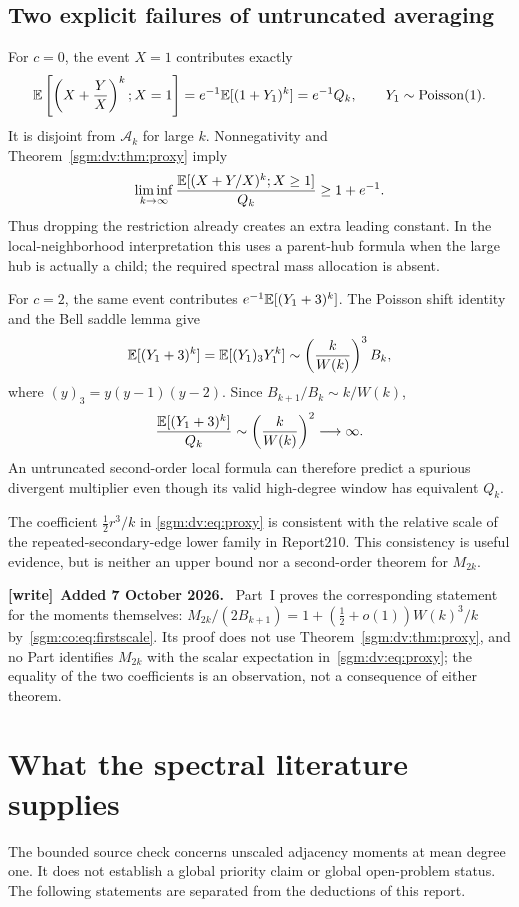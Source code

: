\documentclass[11pt,letterpaper]{article}
\theoremstyle{remark}\newtheorem{remark}[theorem]{Remark}
\newcommand{\Poi}{\operatorname{Poisson}}\newcommand{\Bin}{\operatorname{Bin}}
\newenvironment{writenote}[1][]{\par\smallskip\begingroup\small
 \noindent\textbf{[write]}\if\relax\detokenize{#1}\relax\else~\textbf{#1.}\fi\ }%
 {\par\endgroup\smallskip}
\theoremstyle{definition}\newtheorem{definition}[theorem]{Definition}
\begin{document}
\subsection{Two explicit failures of untruncated averaging}
For $c=0$, the event $X=1$ contributes exactly
\begin{equation}\label{sgm:dv:eq:badconstant}
 \E\left[\left(X+\frac YX\right)^k;X=1\right]
 =e^{-1}\E[(1+Y_1)^k]=e^{-1}Q_k,
 \qquad Y_1\sim\Poi(1).
\end{equation}
It is disjoint from $\mathcal A_k$ for large $k$. Nonnegativity and Theorem~\ref{sgm:dv:thm:proxy} imply
\[
 \liminf_{k\to\infty}
 \frac{\mathbb E[(X+Y/X)^k;X\ge1]}{Q_k}\ge1+e^{-1}.
\]
Thus dropping the restriction already creates an extra leading constant. In the local-neighborhood interpretation this uses a parent-hub formula when the large hub is actually a child; the required spectral mass allocation is absent.

For $c=2$, the same event contributes $e^{-1}\mathbb E[(Y_1+3)^k]$. The Poisson shift identity and the Bell saddle lemma give
\begin{equation}\label{sgm:dv:eq:baddiverge}
 \mathbb E[(Y_1+3)^k]=\mathbb E[(Y_1)_3Y_1^k]
 \sim\left(\frac{k}{W(k)}\right)^3B_k,
\end{equation}
where $(y)_3=y(y-1)(y-2)$. Since $B_{k+1}/B_k\sim k/W(k)$,
\[
 \frac{\mathbb E[(Y_1+3)^k]}{Q_k}
 \sim\left(\frac{k}{W(k)}\right)^2\longrightarrow\infty.
\]
An untruncated second-order local formula can therefore predict a spurious divergent multiplier even though its valid high-degree window has equivalent $Q_k$.

The coefficient $\tfrac12r^3/k$ in \eqref{sgm:dv:eq:proxy} is consistent with the relative scale of the repeated-secondary-edge lower family in Report210. This consistency is useful evidence, but is neither an upper bound nor a second-order theorem for $M_{2k}$.

\begin{writenote}[Added 7 October 2026]
Part~I proves the corresponding statement for the moments themselves: $M_{2k}/(2B_{k+1})=1+(\frac12+o(1))W(k)^3/k$ by~\eqref{sgm:co:eq:firstscale}. Its proof does not use Theorem~\ref{sgm:dv:thm:proxy}, and no Part identifies $M_{2k}$ with the scalar expectation in~\eqref{sgm:dv:eq:proxy}; the equality of the two coefficients is an observation, not a consequence of either theorem.
\end{writenote}

\section{What the spectral literature supplies}\label{sgm:dv:sec:sources}
The bounded source check concerns unscaled adjacency moments at mean degree one. It does not establish a global priority claim or global open-problem status. The following statements are separated from the deductions of this report.
\end{document}
